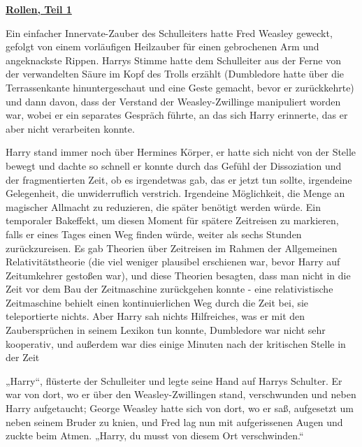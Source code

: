 

\hypertarget{rollen-teil-1}{%

\textbf{\uline{Rollen, Teil 1}}

\hfill\break Ein einfacher Innervate-Zauber des Schulleiters hatte Fred Weasley geweckt, gefolgt von einem vorläufigen Heilzauber für einen gebrochenen Arm und angeknackste Rippen. Harrys Stimme hatte dem Schulleiter aus der Ferne von der verwandelten Säure im Kopf des Trolls erzählt (Dumbledore hatte über die Terrassenkante hinuntergeschaut und eine Geste gemacht, bevor er zurückkehrte) und dann davon, dass der Verstand der Weasley-Zwillinge manipuliert worden war, wobei er ein separates Gespräch führte, an das sich Harry erinnerte, das er aber nicht verarbeiten konnte.

Harry stand immer noch über Hermines Körper, er hatte sich nicht von der Stelle bewegt und dachte so schnell er konnte durch das Gefühl der Dissoziation und der fragmentierten Zeit, ob es irgendetwas gab, das er jetzt tun sollte, irgendeine Gelegenheit, die unwiderruflich verstrich. Irgendeine Möglichkeit, die Menge an magischer Allmacht zu reduzieren, die später benötigt werden würde. Ein temporaler Bakeffekt, um diesen Moment für spätere Zeitreisen zu markieren, falls er eines Tages einen Weg finden würde, weiter als sechs Stunden zurückzureisen. Es gab Theorien über Zeitreisen im Rahmen der Allgemeinen Relativitätstheorie (die viel weniger plausibel erschienen war, bevor Harry auf Zeitumkehrer gestoßen war), und diese Theorien besagten, dass man nicht in die Zeit vor dem Bau der Zeitmaschine zurückgehen konnte - eine relativistische Zeitmaschine behielt einen kontinuierlichen Weg durch die Zeit bei, sie teleportierte nichts. Aber Harry sah nichts Hilfreiches, was er mit den Zaubersprüchen in seinem Lexikon tun konnte, Dumbledore war nicht sehr kooperativ, und außerdem war dies einige Minuten nach der kritischen Stelle in der Zeit

„Harry“, flüsterte der Schulleiter und legte seine Hand auf Harrys Schulter. Er war von dort, wo er über den Weasley-Zwillingen stand, verschwunden und neben Harry aufgetaucht; George Weasley hatte sich von dort, wo er saß, aufgesetzt um neben seinem Bruder zu knien, und Fred lag nun mit aufgerissenen Augen und zuckte beim Atmen. „Harry, du musst von diesem Ort verschwinden.“

}
